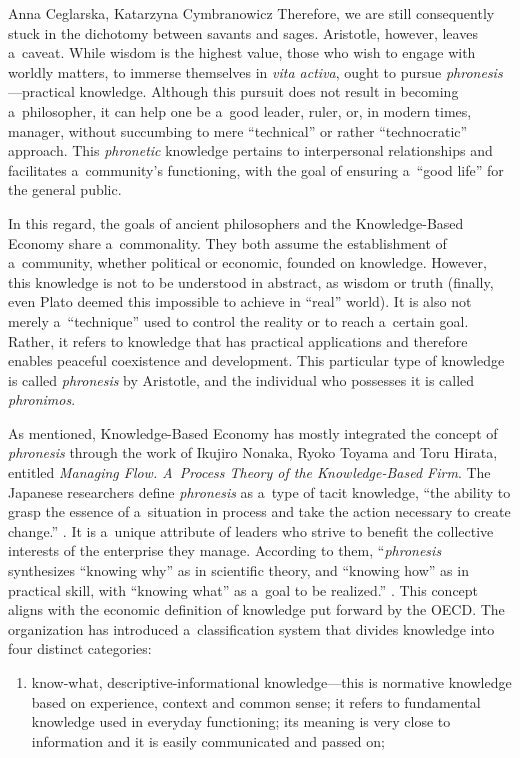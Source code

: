 \begin{artengenv2auth}{Anna Ceglarska, Katarzyna Cymbranowicz}
Therefore, we are still consequently stuck in the dichotomy between savants and sages. Aristotle, however, leaves a~caveat. While wisdom is the highest value, those who wish to engage with worldly matters, to immerse themselves in \textit{vita activa}, ought to pursue \textit{phronesis}---practical knowledge. Although this pursuit does not result in becoming a~philosopher, it can help one be a~good leader, ruler, or, in modern times, manager, without succumbing to mere ``technical'' or rather ``technocratic'' approach. This \textit{phronetic} knowledge pertains to interpersonal relationships and facilitates a~community's functioning, with the goal of ensuring a~``good life'' for the general public.



In this regard, the goals of ancient philosophers and the Knowledge-Based Economy share a~commonality. They both assume the establishment of a~community, whether political or economic, founded on knowledge. However, this knowledge is not to be understood in abstract, as wisdom or truth (finally, even Plato deemed this impossible to achieve in ``real'' world). It is also not merely a~``technique'' used to control the reality or to reach a~certain goal. Rather, it refers to knowledge that has practical applications and therefore enables peaceful coexistence and development. This particular type of knowledge is called \textit{phronesis} by Aristotle, and the individual who possesses it is called \textit{phronimos}.



As mentioned, Knowledge-Based Economy has mostly integrated the concept of \textit{phronesis} through the work of Ikujiro Nonaka, Ryoko Toyama and Toru Hirata, entitled \textit{Managing Flow. A~Process Theory of the Knowledge-Based Firm}. The Japanese researchers define \textit{phronesis} as a~type of tacit knowledge, ``the ability to grasp the essence of a~situation in process and take the action necessary to create change.'' 
\parencite[][p.4]{nonaka_managing_2008}. %
 It is a~unique attribute of leaders who strive to benefit the collective interests of the enterprise they manage. According to them, ``\textit{phronesis} synthesizes ``knowing why'' as in scientific theory, and ``knowing how'' as in practical skill, with ``knowing what'' as a~goal to be realized.'' 
\parencite[][pp.14–15]{nonaka_managing_2008}. %
 This concept aligns with the economic definition of knowledge put forward by the OECD. The organization has introduced a~classification system that divides knowledge into four distinct categories:
\begin{enumerate}
\item know-what, descriptive-informational knowledge---this is normative knowledge based on experience, context and common sense; it refers to fundamental knowledge used in everyday functioning; its meaning is very close to information and it is easily communicated and passed on;


\end{enumerate}
\end{artengenv2auth}
